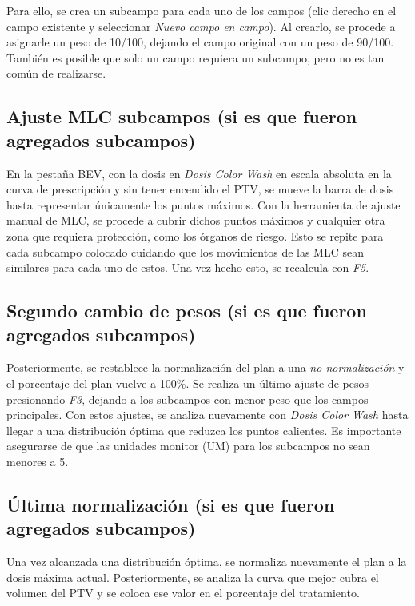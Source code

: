 \documentclass{article}
\begin{document}
Para ello, se crea un subcampo para cada uno de los campos (clic derecho en el campo existente y seleccionar \textit{Nuevo campo en campo}). Al crearlo, se procede a asignarle un peso de 10/100, dejando el campo original con un peso de 90/100. También es posible que solo un campo requiera un subcampo, pero no es tan común de realizarse.

\subsection{Ajuste MLC subcampos (si es que fueron agregados subcampos)}

En la pestaña BEV, con la dosis en \textit{Dosis Color Wash} en escala absoluta en la curva de prescripción y sin tener encendido el PTV, se mueve la barra de dosis hasta representar únicamente los puntos máximos. Con la herramienta de ajuste manual de MLC, se procede a cubrir dichos puntos máximos y cualquier otra zona que requiera protección, como los órganos de riesgo. Esto se repite para cada subcampo colocado cuidando que los movimientos de las MLC sean similares para cada uno de estos. Una vez hecho esto, se recalcula con \textit{F5}.

\subsection{Segundo cambio de pesos (si es que fueron agregados subcampos)}

Posteriormente, se restablece la normalización del plan a una \textit{no normalización} y el porcentaje del plan vuelve a 100\%. Se realiza un último ajuste de pesos presionando \textit{F3}, dejando a los subcampos con menor peso que los campos principales. Con estos ajustes, se analiza nuevamente con \textit{Dosis Color Wash} hasta llegar a una distribución óptima que reduzca los puntos calientes. Es importante asegurarse de que las unidades monitor (UM) para los subcampos no sean menores a 5.

\subsection{Última normalización (si es que fueron agregados subcampos)}

Una vez alcanzada una distribución óptima, se normaliza nuevamente el plan a la dosis máxima actual. Posteriormente, se analiza la curva que mejor cubra el volumen del PTV y se coloca ese valor en el porcentaje del tratamiento.
\end{document}
